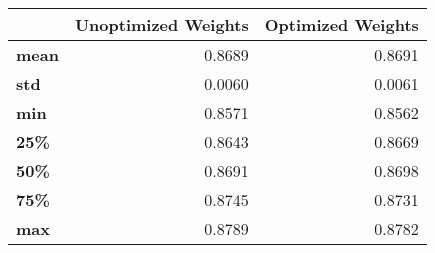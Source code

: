 \begin{tabular}{lrr}
\toprule
{} &  Unoptimized Weights &  Optimized Weights \\
\midrule
\textbf{mean} &               0.8689 &             0.8691 \\
\textbf{std } &               0.0060 &             0.0061 \\
\textbf{min } &               0.8571 &             0.8562 \\
\textbf{25\% } &               0.8643 &             0.8669 \\
\textbf{50\% } &               0.8691 &             0.8698 \\
\textbf{75\% } &               0.8745 &             0.8731 \\
\textbf{max } &               0.8789 &             0.8782 \\
\bottomrule
\end{tabular}
